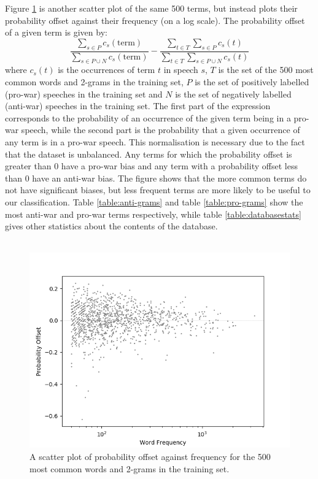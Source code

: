 \documentclass[12pt,a4paper,twoside,openright]{report}
\begin{document}
Figure \ref{fig:ngramoffset} is another scatter plot of the same 500 terms, but instead plots their probability offset against their frequency (on a log scale). The probability offset of a given term is given by:
\begin{equation}
	\frac{\sum_{s \in P}c_{s}(\text{term})}{\sum_{s \in P \cup N}c_{s}(\text{term})} - \frac{\sum_{t \in T}\sum_{s \in P}c_{s}(t)}{\sum_{t \in T}\sum_{s \in P \cup N}c_{s}(t)}
\end{equation}
where $c_{s}(t)$ is the occurrences of term $t$ in speech $s$, $T$ is the set of the 500 most common words and 2-grams in the training set, $P$ is the set of positively labelled (pro-war) speeches in the training set and $N$ is the set of negatively labelled (anti-war) speeches in the training set. The first part of the expression corresponds to the probability of an occurrence of the given term being in a pro-war speech, while the second part is the probability that a given occurrence of any term is in a pro-war speech. This normalisation is necessary due to the fact that the dataset is unbalanced. Any terms for which the probability offset is greater than 0 have a pro-war bias and any term with a probability offset less than 0 have an anti-war bias. The figure shows that the more common terms do not have significant biases, but less frequent terms are more likely to be useful to our classification. Table \ref{table:anti-grams} and table \ref{table:pro-grams} show the most anti-war and pro-war terms respectively, while table \ref{table:databasestats} gives other statistics about the contents of the database.
\\\\
\begin{figure}
	\begin{center}
		\includegraphics[scale=0.8]{figs/ngramoffset.png}
	\end{center}
	\caption{A scatter plot of probability offset against frequency for the 500 most common words and 2-grams in the training set.}
	\label{fig:ngramoffset}
\end{figure} 
\end{document}

